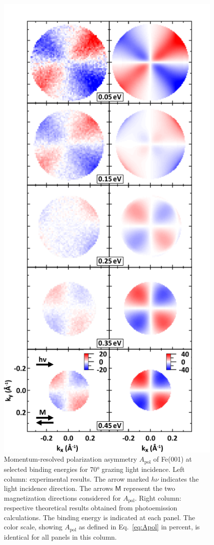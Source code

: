 \documentclass[prl,twocolumn,floatfix,superscriptaddress]{revtex4-2}
\begin{document}
\begin{figure}
    \centering
    \includegraphics[width = 0.7\columnwidth]{FePaperApol.pdf}
    \caption{Momentum-resolved polarization asymmetry $A_{\mathrm{pol}}$ of Fe(001) at selected binding energies for 70° grazing light incidence. Left column: experimental results. The arrow marked $h \nu$ indicates the light incidence direction. The arrows $\textsf{M}$ represent the two magnetization directions considered for $A_{\mathrm{pol}}$. Right column: respective theoretical results obtained from photoemission calculations. The binding energy is indicated at each panel. The color scale, showing $A_{\mathrm{pol}}$ as defined in Eq.~\eqref{eq:Apol} in percent, is identical for all panels in this column. 
    }
    \label{fig:Apol}
\end{figure}
\end{document}
